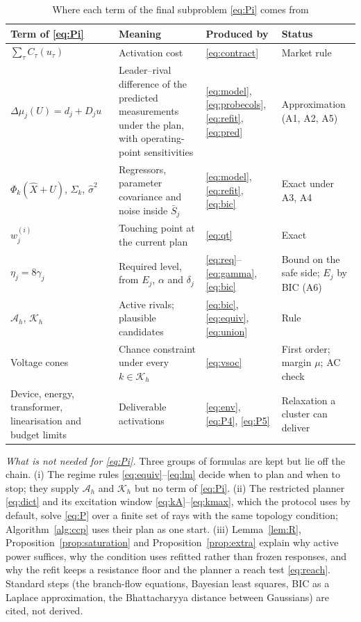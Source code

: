 \documentclass[journal,onecolumn,11pt]{IEEEtran}
\begin{document}
\begin{table}[!htbp]
\centering
\caption{Where each term of the final subproblem \eqref{eq:Pi} comes from}\label{tab:necessity}
\small
\begin{tabular}{@{}>{\raggedright\arraybackslash}p{3.8cm}>{\raggedright\arraybackslash}p{4.4cm}>{\raggedright\arraybackslash}p{3.1cm}>{\raggedright\arraybackslash}p{3.5cm}@{}}
\toprule
Term of \eqref{eq:Pi} & Meaning & Produced by & Status\\
\midrule
$\sum_\tau C_\tau(u_\tau)$ & Activation cost & \eqref{eq:contract} & Market rule\\
$\Delta\mu_j(U)=d_j+D_ju$ & Leader--rival difference of the predicted measurements under the plan, with operating-point sensitivities & \eqref{eq:model}, \eqref{eq:probecols}, \eqref{eq:refit}, \eqref{eq:pred} & Approximation (A1, A2, A5)\\
$\Phi_k(\hat X+U)$, $\Sigma_k$, $\hat\sigma^2$ & Regressors, parameter covariance and noise inside $\bar S_j$ & \eqref{eq:model}, \eqref{eq:refit}, \eqref{eq:bic} & Exact under A3, A4\\
$w_j^{(i)}$ & Touching point at the current plan & \eqref{eq:qt} & Exact\\
$\eta_j=8\gamma_j$ & Required level, from $E_j$, $\alpha$ and $\delta_j$ & \eqref{eq:req}--\eqref{eq:gamma}, \eqref{eq:bic} & Bound on the safe side; $E_j$ by BIC (A6)\\
$\mathcal A_h$, $\mathcal K_h$ & Active rivals; plausible candidates & \eqref{eq:bic}, \eqref{eq:equiv}, \eqref{eq:union} & Rule\\
Voltage cones & Chance constraint under every $k\in\mathcal K_h$ & \eqref{eq:vsoc} & First order; margin $\mu$; AC check\\
Device, energy, transformer, linearisation and budget limits & Deliverable activations & \eqref{eq:env}, \eqref{eq:P4}, \eqref{eq:P5} & Relaxation a cluster can deliver\\
\bottomrule
\end{tabular}
\end{table}

\emph{What is not needed for \eqref{eq:Pi}.} Three groups of formulas are kept but lie off the chain. (i) The regime rules \eqref{eq:equiv}--\eqref{eq:lm} decide when to plan and when to stop; they supply $\mathcal A_h$ and $\mathcal K_h$ but no term of \eqref{eq:Pi}. (ii) The restricted planner \eqref{eq:dict} and its excitation window \eqref{eq:kA}--\eqref{eq:kmax}, which the protocol uses by default, solve \eqref{eq:P} over a finite set of rays with the same topology condition; Algorithm~\ref{alg:ccp} uses their plan as one start. (iii) Lemma~\ref{lem:R}, Proposition~\ref{prop:saturation} and Proposition~\ref{prop:extra} explain why active power suffices, why the condition uses refitted rather than frozen responses, and why the refit keeps a resistance floor and the planner a reach test \eqref{eq:reach}. Standard steps (the branch-flow equations, Bayesian least squares, BIC as a Laplace approximation, the Bhattacharyya distance between Gaussians) are cited, not derived.
\end{document}
